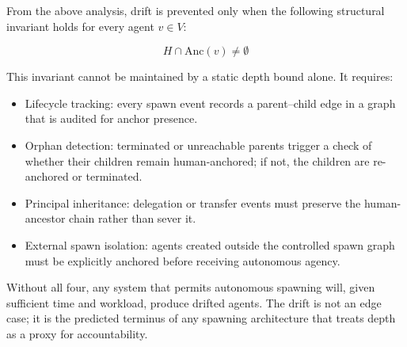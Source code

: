 From the above analysis, drift is prevented only when the following structural invariant holds for every agent $v \in V$:

\[
H \cap \mathrm{Anc}(v) \neq \emptyset
\]

This invariant cannot be maintained by a static depth bound alone. It requires:
\begin{itemize}
\item Lifecycle tracking: every spawn event records a parent--child edge in a graph that is audited for anchor presence.
\item Orphan detection: terminated or unreachable parents trigger a check of whether their children remain human-anchored; if not, the children are re-anchored or terminated.
\item Principal inheritance: delegation or transfer events must preserve the human-ancestor chain rather than sever it.
\item External spawn isolation: agents created outside the controlled spawn graph must be explicitly anchored before receiving autonomous agency.
\end{itemize}

Without all four, any system that permits autonomous spawning will, given sufficient time and workload, produce drifted agents. The drift is not an edge case; it is the predicted terminus of any spawning architecture that treats depth as a proxy for accountability.